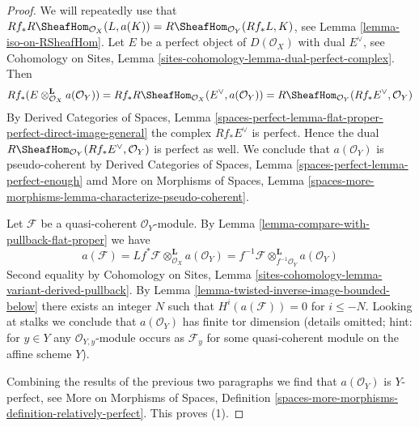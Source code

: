 \begin{proof}
We will repeatedly use that
$Rf_*R\SheafHom_{\mathcal{O}_X}(L, a(K)) =
R\SheafHom_{\mathcal{O}_Y}(Rf_*L, K)$, see
Lemma \ref{lemma-iso-on-RSheafHom}.
Let $E$ be a perfect object of $D(\mathcal{O}_X)$
with dual $E^\vee$, see Cohomology on Sites, Lemma
\ref{sites-cohomology-lemma-dual-perfect-complex}.
Then
$$
Rf_*(E \otimes_{\mathcal{O}_X}^\mathbf{L} a(\mathcal{O}_Y)) =
Rf_*R\SheafHom_{\mathcal{O}_X}(E^\vee, a(\mathcal{O}_Y)) =
R\SheafHom_{\mathcal{O}_Y}(Rf_*E^\vee, \mathcal{O}_Y)
$$
By Derived Categories of Spaces, Lemma
\ref{spaces-perfect-lemma-flat-proper-perfect-direct-image-general}
the complex $Rf_*E^\vee$ is perfect.
Hence the dual $R\SheafHom_{\mathcal{O}_Y}(Rf_*E^\vee, \mathcal{O}_Y)$
is perfect as well. We conclude that $a(\mathcal{O}_Y)$
is pseudo-coherent by
Derived Categories of Spaces, Lemma
\ref{spaces-perfect-lemma-perfect-enough} amd
More on Morphisms of Spaces, Lemma
\ref{spaces-more-morphisms-lemma-characterize-pseudo-coherent}.

\medskip\noindent
Let $\mathcal{F}$ be a quasi-coherent $\mathcal{O}_Y$-module. By
Lemma \ref{lemma-compare-with-pullback-flat-proper} we have
$$
a(\mathcal{F}) =
Lf^*\mathcal{F} \otimes_{\mathcal{O}_X}^\mathbf{L} a(\mathcal{O}_Y) =
f^{-1}\mathcal{F} \otimes_{f^{-1}\mathcal{O}_Y}^\mathbf{L} a(\mathcal{O}_Y)
$$
Second equality by Cohomology on Sites, Lemma
\ref{sites-cohomology-lemma-variant-derived-pullback}.
By Lemma \ref{lemma-twisted-inverse-image-bounded-below}
there exists an integer $N$ such that
$H^i(a(\mathcal{F})) = 0$ for $i \leq -N$.
Looking at stalks we conclude that $a(\mathcal{O}_Y)$ has finite
tor dimension (details omitted; hint: for $y \in Y$ any
$\mathcal{O}_{Y, y}$-module occurs as $\mathcal{F}_y$
for some quasi-coherent module on the affine scheme $Y$).

\medskip\noindent
Combining the results of the previous two paragraphs we find that
$a(\mathcal{O}_Y)$ is $Y$-perfect, see
More on Morphisms of Spaces, Definition
\ref{spaces-more-morphisms-definition-relatively-perfect}.
This proves (1).


\end{proof}
